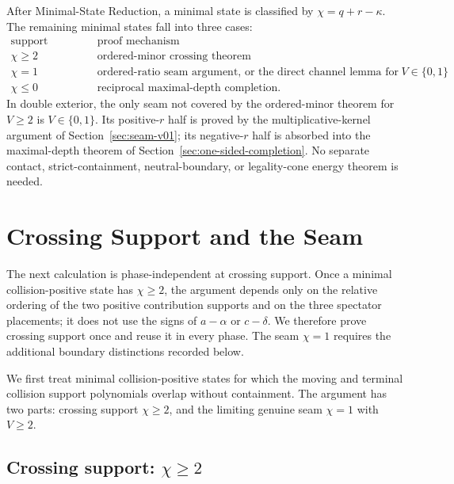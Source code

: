 \documentclass[11pt]{article}
\theoremstyle{definition}
\begin{document}
After Minimal-State Reduction, a minimal state is classified by \(\chi=q+r-\kappa\).  The remaining minimal states fall into three cases:
\begin{equation*}
\begin{array}{c|c}
\text{support geometry}&\text{proof mechanism}\\ \hline
\chi\ge2 & \text{ordered-minor crossing theorem}\\
\chi=1 & \text{ordered-ratio seam argument, or the direct channel lemma for \(V\in\{0,1\}\)}\\
\chi\le0 & \text{reciprocal maximal-depth completion.}
\end{array}
\end{equation*}
In double exterior, the only seam not covered by the ordered-minor theorem for \(V\ge2\) is \(V\in\{0,1\}\).  Its positive-\(r\) half is proved by the multiplicative-kernel argument of Section~\ref{sec:seam-v01}; its negative-\(r\) half is absorbed into the maximal-depth theorem of Section~\ref{sec:one-sided-completion}.  No separate contact, strict-containment, neutral-boundary, or legality-cone energy theorem is needed.

\section{Crossing Support and the Seam}
\label{sec:crossing-seam}

The next calculation is phase-independent at crossing support.  Once a minimal collision-positive state has \(\chi\ge2\), the argument depends only on the relative ordering of the two positive contribution supports and on the three spectator placements; it does not use the signs of \(a-\alpha\) or \(c-\delta\).  We therefore prove crossing support once and reuse it in every phase.  The seam \(\chi=1\) requires the additional boundary distinctions recorded below.


\label{sec:one-sided-crossing}

We first treat minimal collision-positive states for which the moving and terminal collision support polynomials overlap without containment. The argument has two parts: crossing support \(\chi\ge2\), and the limiting genuine seam \(\chi=1\) with \(V\ge2\).

\subsection{Crossing support: \texorpdfstring{\(\chi\ge2\)}{chi >= 2}}
\label{crossing-support-chige2}
\end{document}
